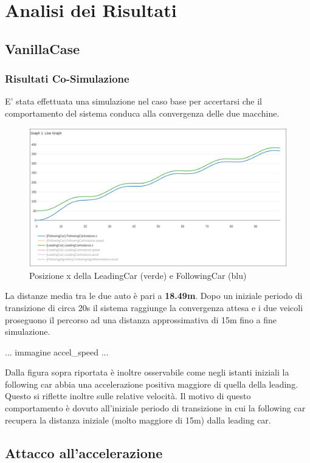 \section{Analisi dei Risultati}
\subsection{VanillaCase}
\subsubsection{Risultati Co-Simulazione}
E' stata effettuata una simulazione nel caso base per accertarsi che il comportamento del sistema conduca alla convergenza delle due macchine.

\begin{figure}[h]
	\centering
	\includegraphics[width=\textwidth]{img/x.png}
	\caption{Posizione x della LeadingCar (verde) e FollowingCar (blu)}
\end{figure}

La distanze media tra le due auto è pari a \textbf{18.49m}. Dopo un iniziale periodo di transizione di circa 20s il sistema raggiunge la convergenza attesa e i due veicoli proseguono il percorso ad una distanza approssimativa di 15m fino a fine simulazione.

... immagine accel\_speed ...

Dalla figura sopra riportata è inoltre osservabile come negli istanti iniziali la following car abbia una accelerazione positiva maggiore di quella della leading. Questo si riflette inoltre sulle relative velocità. Il motivo di questo comportamento è dovuto all'iniziale periodo di transizione in cui la following car recupera la distanza iniziale (molto maggiore di 15m) dalla leading car. 

\subsection{Attacco all'accelerazione}
